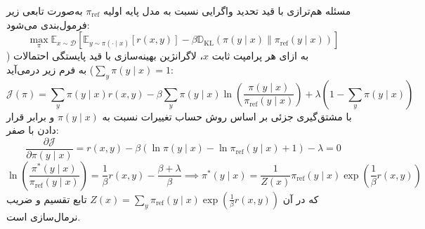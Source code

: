 مسئله هم‌ترازی با قید تحدید واگرایی  نسبت به مدل پایه اولیه $\pi_{\text{ref}}$ به‌صورت تابعی زیر فرمول‌بندی می‌شود:
\begin{equation}
    \max_{\pi} \mathbb{E}_{x \sim \mathcal{D}} \left[ \mathbb{E}_{y \sim \pi(\cdot \mid x)} [r(x, y)] - \beta \mathbb{D}_{\text{KL}}(\pi(y \mid x) \parallel \pi_{\text{ref}}(y \mid x)) \right]
\end{equation}
به ازای هر پرامپت ثابت $x$، لاگرانژین بهینه‌سازی با قید پایستگی احتمالات ($\sum_y \pi(y \mid x) = 1$) به فرم زیر درمی‌آید:
\begin{equation}
    \mathcal{J}(\pi) = \sum_{y} \pi(y \mid x) r(x, y) - \beta \sum_{y} \pi(y \mid x) \ln \left( \frac{\pi(y \mid x)}{\pi_{\text{ref}}(y \mid x)} \right) + \lambda \left( 1 - \sum_{y} \pi(y \mid x) \right)
\end{equation}
با مشتق‌گیری جزئی بر اساس روش حساب تغییرات نسبت به $\pi(y \mid x)$ و برابر قرار دادن با صفر:
\begin{equation}
    \frac{\partial \mathcal{J}}{\partial \pi(y \mid x)} = r(x, y) - \beta \left( \ln \pi(y \mid x) - \ln \pi_{\text{ref}}(y \mid x) + 1 \right) - \lambda = 0
\end{equation}
\begin{equation}
    \ln \left( \frac{\pi^*(y \mid x)}{\pi_{\text{ref}}(y \mid x)} \right) = \frac{1}{\beta} r(x, y) - \frac{\beta + \lambda}{\beta} \implies \pi^*(y \mid x) = \frac{1}{Z(x)} \pi_{\text{ref}}(y \mid x) \exp\left( \frac{1}{\beta} r(x, y) \right)
\end{equation}
که در آن $Z(x) = \sum_y \pi_{\text{ref}}(y \mid x) \exp\left( \frac{1}{\beta} r(x, y) \right)$ تابع تقسیم و ضریب نرمال‌سازی است.

